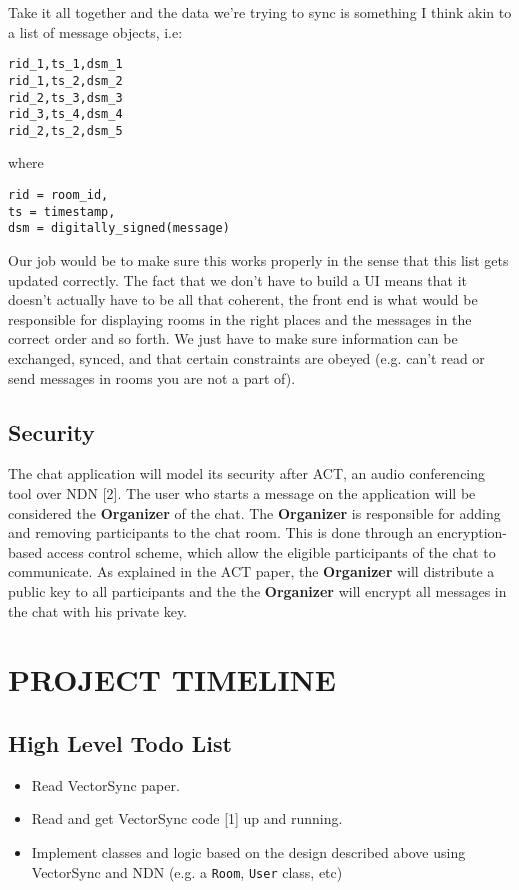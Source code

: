 \documentclass[letterpaper, 10 pt, conference]{ieeeconf}  %
\begin{document}
Take it all together and the data we’re trying to sync is something I think akin to a list of message objects, i.e: 
\begin{verbatim}
rid_1,ts_1,dsm_1
rid_1,ts_2,dsm_2
rid_2,ts_3,dsm_3
rid_3,ts_4,dsm_4
rid_2,ts_2,dsm_5
\end{verbatim}

where \begin{verbatim}
rid = room_id, 
ts = timestamp, 
dsm = digitally_signed(message)
\end{verbatim}
Our job would be to make sure this works properly in the sense that this list gets updated correctly. The fact that we don’t have to build a UI means that it doesn’t actually have to be all that coherent, the front end is what would be responsible for displaying rooms in the right places and the messages in the correct order and so forth. We just have to make sure information can be exchanged, synced, and that certain constraints are obeyed (e.g. can’t read or send messages in rooms you are not a part of). 

\subsection{Security}

	The chat application will model its security after ACT, an audio conferencing tool over NDN [2].
	The user who starts a message on the application will be considered the \textbf{Organizer} of the chat. The \textbf{Organizer} is responsible for adding and removing participants to the chat room. This is done through an encryption-based access control scheme, which allow the eligible participants of the chat to communicate. As explained in the ACT paper, the \textbf{Organizer} will distribute a public key to all participants and the the \textbf{Organizer} will encrypt all messages in the chat with his private key.

\section{PROJECT TIMELINE}

\subsection{High Level Todo List}

\begin{itemize}
\item Read VectorSync paper.
\item Read and get VectorSync code [1] up and running.
\item Implement classes and logic based on the design described above using VectorSync and NDN (e.g. a \verb|Room|, \verb|User| class, etc)
\end{itemize}
\end{document}
